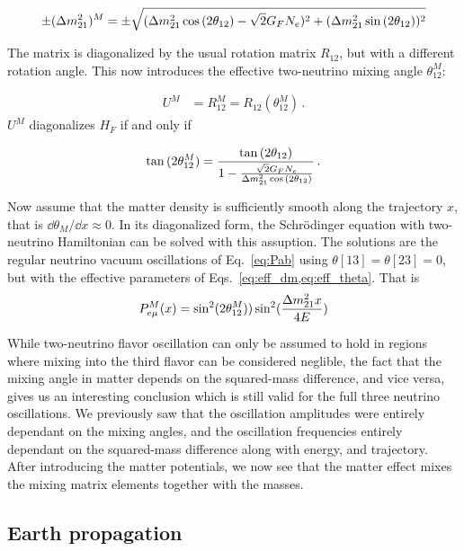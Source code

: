 \begin{align}\label{eq:eff_dm}
    \pm (\dm[21])^M = \pm \sqrt{(\dm[21] \cos{(2\theta_{12}) - \sqrt{2}G_F N_e})^2 + (\dm[21]\sin{(2\theta_{12})})^2}
\end{align}

The matrix is diagonalized by the usual rotation matrix $R_{12}$, but with a different rotation angle. This now introduces the effective two-neutrino mixing angle $\theta_{12}^M$:

\begin{align}
    U^M &= R_{12}^M = R_{12}(\theta_{12}^M)\,.
\end{align}
$U^M$ diagonalizes $H_F$ if and only if 

\begin{align}\label{eq:eff_theta}
    \tan{(2\theta_{12}^M)} = \frac{\tan{(2\theta_{12})}}{1- \frac{\sqrt{2}G_F N_e}{\dm[21]\cos{(2\theta_{12})}}}\,.
\end{align}


Now assume that the matter density is sufficiently smooth along the trajectory $x$, that is $\dd \theta_M / \dd x \approx 0$.
In its diagonalized form, the Schrödinger equation with two-neutrino Hamiltonian can be solved with this assuption. 
The solutions are the regular neutrino vacuum oscillations of Eq.~\eqref{eq:Pab} using $\theta[13] = \theta[23] =0$, but with the effective parameters of Eqs.~\eqref{eq:eff_dm,eq:eff_theta}. That is
\begin{align}
    P_{e\mu}^M(x) = \sin^2(2\theta_{12}^M))\sin^2(\frac{\dm[21]x}{4E})
\end{align}

While two-neutrino flavor oscillation can only be assumed to hold in regions where mixing into the third flavor can be considered neglible,
the fact that the mixing angle in matter depends on the squared-mass difference, and vice versa, gives us an interesting conclusion which is 
still valid for the full three neutrino oscillations. We previously saw that the oscillation amplitudes were entirely dependant on
the mixing angles, and the oscillation frequencies entirely dependant on the squared-mass difference along with energy, and trajectory. After 
introducing the matter potentials, we now see that the matter effect mixes the mixing matrix elements together with the masses.

\subsection{Earth propagation}

